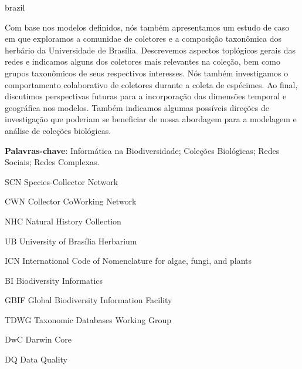 \documentclass[
	12pt,				%
	openright,			%
	oneside,			%
	a4paper,			%
	sumario=tradicional,%
	french,				%
	spanish,			%
	brazil,				%
    english
	]{abntex2}
\begin{document}
\begin{resumo}[Resumo]
\begin{otherlanguage*}{brazil}
\begin{small}
Com base nos modelos definidos, nós também apresentamos um estudo de caso em que exploramos a comunidae de coletores e a composição taxonômica dos herbário da Universidade de Brasília.
Descrevemos aspectos toplógicos gerais das redes e indicamos alguns dos coletores mais relevantes na coleção, bem como grupos taxonômicos de seus respectivos interesses.
Nós também investigamos o comportamento colaborativo de coletores durante a coleta de espécimes.
Ao final, discutimos perspectivas futuras para a incorporação das dimensões temporal e geográfica nos modelos.
Também indicamos algumas possíveis direções de investigação que poderiam se beneficiar de nossa abordagem para a modelagem e análise de coleções biológicas.

\textbf{Palavras-chave}: Informática na Biodiversidade; Coleções Biológicas; Redes Sociais; Redes Complexas.
\end{small}
\end{otherlanguage*}
\end{resumo}

%

%

\listoffigures*
\cleardoublepage

\listoftables*
\cleardoublepage

\begin{siglas}
  \item[SCN] Species-Collector Network
  \item[CWN] Collector CoWorking Network
  \item[NHC] Natural History Collection
  \item[UB] University of Brasília Herbarium
  \item[ICN] International Code of Nomenclature for algae, fungi, and plants 
  \item[BI] Biodiversity Informatics
  \item[GBIF] Global Biodiversity Information Facility
  \item[TDWG] Taxonomic Databases Working Group
  \item[DwC] Darwin Core
  \item[DQ] Data Quality
  
\end{siglas}
\end{document}
